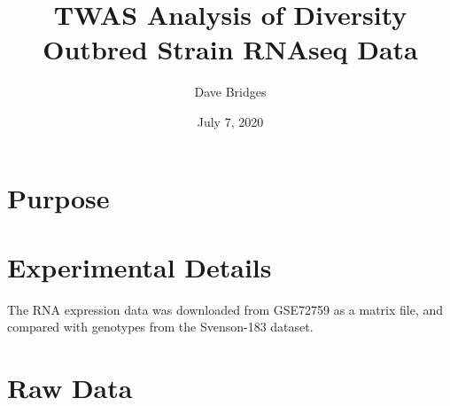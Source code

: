 \documentclass[
]{article}
\title{TWAS Analysis of Diversity Outbred Strain RNAseq Data}
\author{Dave Bridges}
\date{July 7, 2020}
\begin{document}
\maketitle

{
\setcounter{tocdepth}{2}
\tableofcontents
}
\hypertarget{purpose}{%
\section{Purpose}\label{purpose}}

\hypertarget{experimental-details}{%
\section{Experimental Details}\label{experimental-details}}

The RNA expression data was downloaded from GSE72759 as a matrix file,
and compared with genotypes from the Svenson-183 dataset.

\hypertarget{raw-data}{%
\section{Raw Data}\label{raw-data}}
\end{document}
